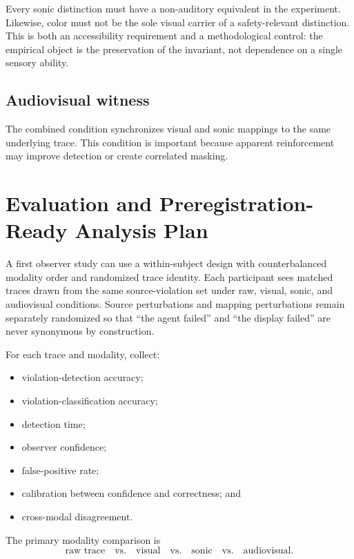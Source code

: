 \documentclass[11pt]{article}
\begin{document}
Every sonic distinction must have a non-auditory equivalent in the experiment. Likewise, color must not be the sole visual carrier of a safety-relevant distinction. This is both an accessibility requirement and a methodological control: the empirical object is the preservation of the invariant, not dependence on a single sensory ability.

\subsection{Audiovisual witness}
The combined condition synchronizes visual and sonic mappings to the same underlying trace. This condition is important because apparent reinforcement may improve detection or create correlated masking.

\section{Evaluation and Preregistration-Ready Analysis Plan}
A first observer study can use a within-subject design with counterbalanced modality order and randomized trace identity. Each participant sees matched traces drawn from the same source-violation set under raw, visual, sonic, and audiovisual conditions. Source perturbations and mapping perturbations remain separately randomized so that ``the agent failed'' and ``the display failed'' are never synonymous by construction.

For each trace and modality, collect:
\begin{itemize}
    \item violation-detection accuracy;
    \item violation-classification accuracy;
    \item detection time;
    \item observer confidence;
    \item false-positive rate;
    \item calibration between confidence and correctness; and
    \item cross-modal disagreement.
\end{itemize}
The primary modality comparison is
\begin{equation}
\text{raw trace}
\quad\text{vs.}\quad
\text{visual}
\quad\text{vs.}\quad
\text{sonic}
\quad\text{vs.}\quad
\text{audiovisual}.
\end{equation}
\end{document}
